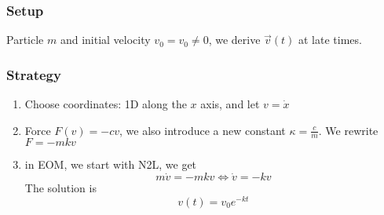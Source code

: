 \documentclass{article}
\newtheorem{one minute paper}[theorem]{One Minute Paper}
\begin{document}
\subsubsection*{Setup} Particle $m$ and initial velocity $v_0 = v_0 \neq 0$, we derive $\vec{v}(t)$ at late times. 

\subsubsection*{Strategy}
\begin{enumerate}
    \item Choose coordinates: 1D along the $x$ axis, and let $v = \dot{x}$
    \item Force $F(v) = -cv$, we also introduce a new constant $\kappa = \frac{c}{m}$. We rewrite $F = -mkv$
    \item in EOM, we start with N2L, we get 
    \begin{equation}
        m\dot{v} = -mkv \iff \dot{v} = -kv
    \end{equation}
    The solution is 
    \begin{equation}
        v(t) = v_0e^{-kt}
    \end{equation}
\end{enumerate}
\end{document}
